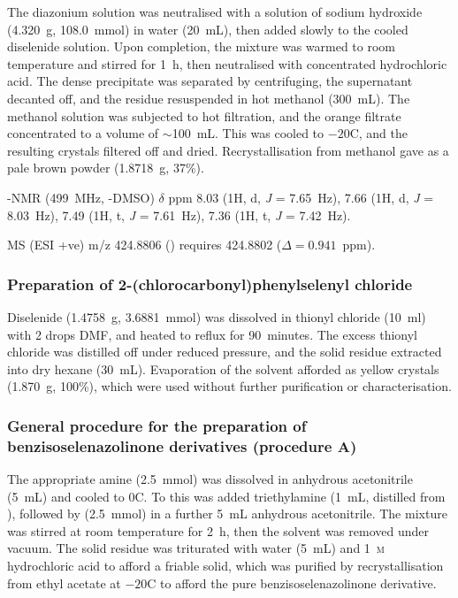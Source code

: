 \begin{refsection}
The diazonium solution was neutralised with a solution of sodium hydroxide (4.320~g, 108.0~mmol) in water (20~mL), then added slowly to the cooled diselenide solution.
Upon completion, the mixture was warmed to room temperature and stirred for 1~h, then neutralised with concentrated hydrochloric acid.
The dense precipitate was separated by centrifuging, the supernatant decanted off, and the residue resuspended in hot methanol (300~mL).
The methanol solution was subjected to hot filtration, and the orange filtrate concentrated to a volume of $\sim$100~mL.
This was cooled to $-20$\degree{}C, and the resulting crystals filtered off and dried.
Recrystallisation from methanol gave  as a pale brown powder (1.8718~g, 37\%).

-NMR (499~MHz, -DMSO) $\delta$ ppm 8.03 (1H, d, \textit{J} = 7.65~Hz), 7.66 (1H, d, \textit{J} = 8.03~Hz), 7.49 (1H, t, \textit{J} = 7.61~Hz), 7.36 (1H, t, \textit{J} = 7.42~Hz).

MS (ESI +ve) m/z 424.8806 ()  requires 424.8802 ($ \Delta =0.941$~ppm).

\subsubsection[Preparation of \refcmpd{dichloride}]{Preparation of 2-(chlorocarbonyl)phenylselenyl chloride }
Diselenide  (1.4758~g, 3.6881~mmol) was dissolved in thionyl chloride (10~ml) with 2 drops DMF, and heated to reflux for 90~minutes.
The excess thionyl chloride was distilled off under reduced pressure, and the solid residue extracted into dry hexane (30~mL).
Evaporation of the solvent afforded  as yellow crystals (1.870~g, 100\%), which were used without further purification or characterisation.

\subsubsection[General procedure A]{General procedure for the preparation of benzisoselenazolinone derivatives  (procedure A)}
The appropriate amine (2.5~mmol) was dissolved in anhydrous acetonitrile (5~mL) and cooled to 0\degree{}C.
To this was added triethylamine (1~mL, distilled from ), followed by  (2.5~mmol) in a further 5~mL anhydrous acetonitrile.
The mixture was stirred at room temperature for 2~h, then the solvent was removed under vacuum.
The solid residue was triturated with water (5~mL) and 1~\textsc{m} hydrochloric acid to afford a friable solid, which was purified by recrystallisation from ethyl acetate at $-20$\degree{}C to afford the pure benzisoselenazolinone derivative.


\end{refsection}
